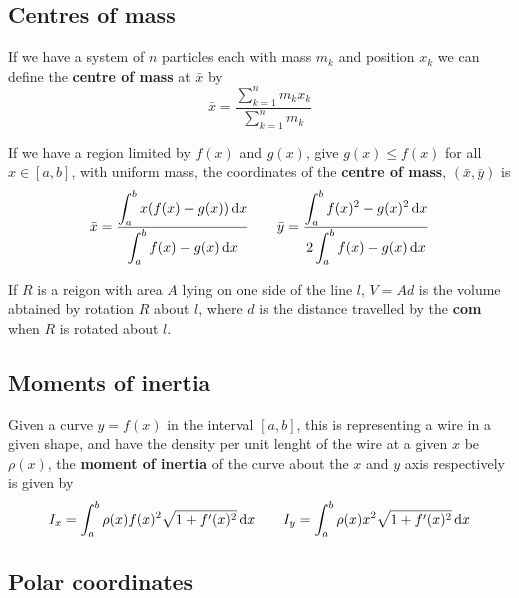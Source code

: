 \documentclass[../Year1.tex]{subfiles}
\begin{document}
\subsection{Centres of mass}

\begin{theorem}
    If we have a system of $n$ particles each with mass $m_k$ and position $x_k$ we can define the \textbf{centre of mass} at $\bar{x}$ by \[
        \bar{x} = \frac{\displaystyle\sum_{k=1}^nm_kx_k}{\displaystyle\sum_{k=1}^nm_k}
    \]
\end{theorem}

\begin{theorem}
    If we have a region limited by $f(x)$ and $g(x)$, give $g(x)\leq f(x)$ for all $x\in[a,b]$, with uniform mass, the coordinates of the \textbf{centre of mass}, $(\bar{x},\bar{y})$ is \[
        \bar{x} = \frac{\displaystyle\intd{a}{b}{x(f(x)-g(x))}{x}}{\displaystyle\intd{a}{b}{f(x)-g(x)}{x}} \qquad
        \bar{y} = \frac{\displaystyle\intd{a}{b}{f(x)^2-g(x)^2}{x}}{\displaystyle2\intd{a}{b}{f(x)-g(x)}{x}}
    \]
\end{theorem}

\begin{theorem}
    If $R$ is a reigon with area $A$ lying on one side of the line $l$, $V=Ad$ is the volume abtained by rotation $R$ about $l$, where $d$ is the distance travelled by the \textbf{com} when $R$ is rotated about $l$.
\end{theorem}

\subsection{Moments of inertia}

\begin{theorem}
    Given a curve $y=f(x)$ in the interval $[a,b]$, this is representing a wire in a given shape, and have the density per unit lenght of the wire at a given $x$ be $\rho(x)$, the \textbf{moment of inertia} of the curve about the $x$ and $y$ axis respectively is given by \[
        I_x = \intd{a}{b}{\rho(x)f(x)^2\sqrt{1+f'(x)^2}}{x} \qquad I_y = \intd{a}{b}{\rho(x)x^2\sqrt{1+f'(x)^2}}{x}
    \]
\end{theorem}

\subsection{Polar coordinates}
\end{document}
